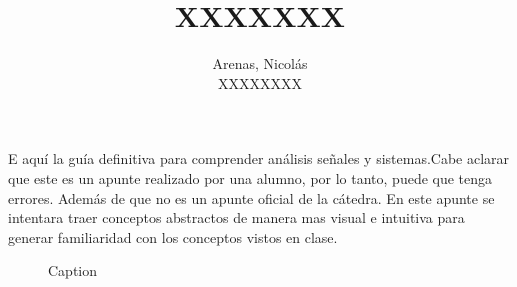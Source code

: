 

\catedra{}
\title{XXXXXXX}

\author{
        Arenas, Nicolás
        \par
        XXXXXXXX

}
\date{\the\year}






\maketitle
\tableofcontents
\newpage
{}
E aquí la guía definitiva para comprender análisis señales y sistemas.Cabe aclarar que este es un apunte realizado por una alumno, por lo tanto, puede que tenga errores. Además de que no es un apunte oficial de la cátedra. 
En este apunte se intentara traer conceptos abstractos de manera mas visual e intuitiva para generar familiaridad con los conceptos vistos en clase.





\begin{figure}
    \centering
    
    \caption{Caption}
    \label{fig:enter-label}
\end{figure}

